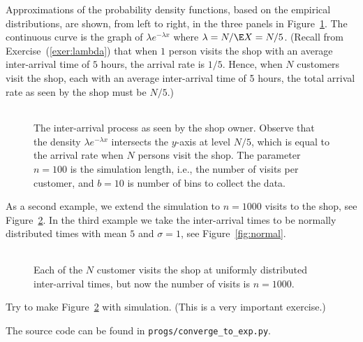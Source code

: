 Approximations of the probability density functions, based on the empirical distributions, are shown, from left to right,
in the three panels in Figure~\ref{fig:uniformfew}. The continuous
curve is the graph of $\lambda e^{-\lambda x}$ where
$\lambda = N/\E X = N/5$. (Recall from Exercise~(\ref{exer:lambda}) that when $1$
person visits the shop  with an average inter-arrival time of $5$
hours,  the arrival rate is $1/5$. Hence, when $N$ customers visit the shop, each with an average inter-arrival time of 5 hours, the total arrival rate as seen by the shop must be $N/5$.)


\begin{figure}[ht]
  \centering
  \begin{tabular}[h]{c}
 \\
  \end{tabular}
  \caption{The inter-arrival process as seen by the shop owner. Observe
    that the density $\lambda e^{-\lambda x}$ intersects the $y$-axis
    at level $N/5$, which is equal to the arrival rate when $N$
    persons visit the shop. The parameter $n=100$ is the simulation
    length, i.e., the number of visits per customer, and $b=10$ is
    number of bins to collect the data.}
  \label{fig:uniformfew}
\end{figure}

As a second
example, we extend the simulation to $n=1000$ visits to the shop, see
Figure~\ref{fig:uniformmany}. In the third example we take the
inter-arrival times to be normally distributed times with mean $5$ and
$\sigma=1$, see Figure~\ref{fig:normal}.

\begin{figure}[ht]
  \centering
  \begin{tabular}[h]{c}
 \\
  \end{tabular}
  \caption{Each of the $N$ customer visits the shop at uniformly 
    distributed inter-arrival times, but now the number of visits is
    $n=1000$.}  
  \label{fig:uniformmany}
\end{figure}

\begin{exercise}
  Try to make Figure~\ref{fig:uniformmany} with simulation. (This is a very important exercise.)
  \begin{solution}
    The source code can be found in \texttt{progs/converge\_to\_exp.py}.
\end{solution}
\end{exercise}

